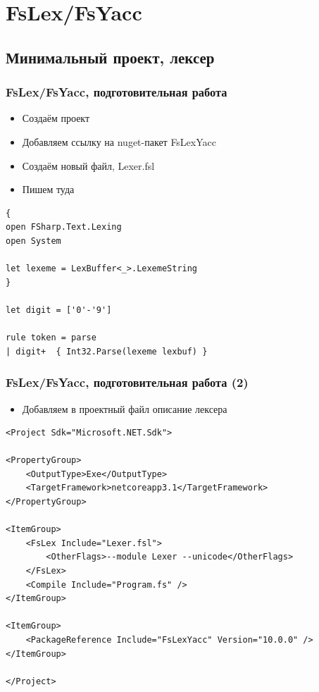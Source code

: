 \documentclass{../../slides-style}
\begin{document}
    \section{FsLex/FsYacc}

    \subsection{Минимальный проект, лексер}

    \begin{frame}[fragile]
        \frametitle{FsLex/FsYacc, подготовительная работа}
        \begin{itemize}
            \item Создаём проект
            \item Добавляем ссылку на nuget-пакет FsLexYacc
            \item Создаём новый файл, Lexer.fsl
            \item Пишем туда
        \end{itemize}
        \begin{small}
            \begin{verbatim}
{ 
open FSharp.Text.Lexing
open System

let lexeme = LexBuffer<_>.LexemeString
}

let digit = ['0'-'9']

rule token = parse
| digit+  { Int32.Parse(lexeme lexbuf) }
            \end{verbatim}
        \end{small}
    \end{frame}

    \begin{frame}[fragile]
        \frametitle{FsLex/FsYacc, подготовительная работа (2)}
        \begin{itemize}
            \item Добавляем в проектный файл описание лексера
        \end{itemize}
        \begin{scriptsize}
            \begin{verbatim}
<Project Sdk="Microsoft.NET.Sdk">

<PropertyGroup>
    <OutputType>Exe</OutputType>
    <TargetFramework>netcoreapp3.1</TargetFramework>
</PropertyGroup>

<ItemGroup>
    <FsLex Include="Lexer.fsl">
        <OtherFlags>--module Lexer --unicode</OtherFlags>
    </FsLex>
    <Compile Include="Program.fs" />
</ItemGroup>

<ItemGroup>
    <PackageReference Include="FsLexYacc" Version="10.0.0" />
</ItemGroup>

</Project>
            \end{verbatim}
        \end{scriptsize}
    \end{frame}
    
\end{document}
